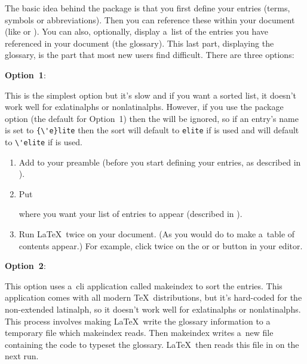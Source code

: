 \documentclass[report,inlinetitle]{nlctdoc}
\makeatletter
\newcommand*{\optionlabel}[1]{%
 \@glstarget{option#1}{}\textbf{Option~#1}}
\makeatother
\begin{document}
The basic idea behind the  package is that you
first define your entries (terms, symbols or abbreviations). Then
you can reference these within your document (like  or
).  You can also, optionally, display a~list of the entries
you have referenced in your document (the glossary). This last part,
displaying the glossary, is the part that most new users find
difficult. There are three options:

\begin{description}
\item[]\optionlabel1: 

 This is the simplest option but it's slow and if
 you want a sorted list, it doesn't work well for \glspl{exlatinalph} or 
 \glspl{nonlatinalph}. However, if you use the
  package option (the default for
 Option~1) then the  will be
 ignored, so if an entry's name is set to \verb|{\'e}lite| then the
 sort will default to \texttt{elite} if 
  is used
 and will default to \verb|\'elite| if 
 is used.

  \begin{enumerate}
    \item Add  to your preamble (before you
    start defining your entries, as described in
    ).

    \item Put
\begin{definition}
\end{definition}
    where you want your list of entries to appear (described in
    ).

    \item Run \LaTeX\ twice on your document. (As you would do to
    make a~table of contents appear.) For example, click twice on
    the  or  or  button in your editor.
  \end{enumerate}

\item\optionlabel2:

   This option uses a~\gls{cli} application called \gls{makeindex} to sort 
   the entries. This application comes with all modern \TeX\ distributions, 
   but it's hard-coded for the non-extended \gls{latinalph}, so 
   it doesn't work well for \glspl{exlatinalph} or
   \glspl{nonlatinalph}. This process involves making \LaTeX\ write the 
   glossary information to a temporary file which \gls{makeindex} reads. 
   Then \gls{makeindex} writes a~new file containing the code to typeset 
   the glossary. \LaTeX\ then reads this file in on the next run.


\end{description}
\end{document}
